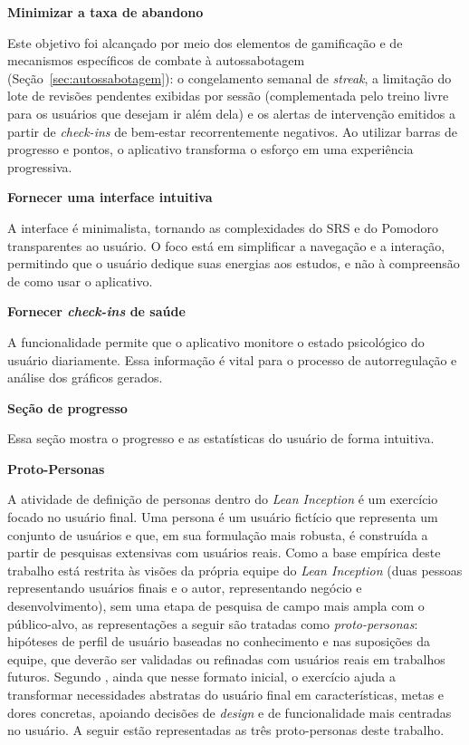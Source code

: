 \textbf{Minimizar a taxa de abandono}

Este objetivo foi alcançado por meio dos elementos de gamificação e de mecanismos específicos de combate à autossabotagem (Seção~\ref{sec:autossabotagem}): o congelamento semanal de \textit{streak}, a limitação do lote de revisões pendentes exibidas por sessão (complementada pelo treino livre para os usuários que desejam ir além dela) e os alertas de intervenção emitidos a partir de \textit{check-ins} de bem-estar recorrentemente negativos.
Ao utilizar barras de progresso e pontos, o aplicativo transforma o esforço em uma experiência progressiva.

\textbf{Fornecer uma interface intuitiva}

A interface é minimalista, tornando as complexidades do SRS e do Pomodoro transparentes ao usuário.
O foco está em simplificar a navegação e a interação, permitindo que o usuário dedique suas energias aos estudos, e não à compreensão de como usar o aplicativo.

\textbf{Fornecer \textit{check-ins} de saúde}

A funcionalidade permite que o aplicativo monitore o estado psicológico do usuário diariamente.
Essa informação é vital para o processo de autorregulação e análise dos gráficos gerados.

\textbf{Seção de progresso}

Essa seção mostra o progresso e as estatísticas do usuário de forma intuitiva.

\textbf{Proto-Personas}

A atividade de definição de personas dentro do \textit{Lean Inception} é um exercício focado no usuário final.
Uma persona é um usuário fictício que representa um conjunto de usuários e que, em sua formulação mais robusta, é construída a partir de pesquisas extensivas com usuários reais.
Como a base empírica deste trabalho está restrita às visões da própria equipe do \textit{Lean Inception} (duas pessoas representando usuários finais e o autor, representando negócio e desenvolvimento), sem uma etapa de pesquisa de campo mais ampla com o público-alvo, as representações a seguir são tratadas como \textit{proto-personas}: hipóteses de perfil de usuário baseadas no conhecimento e nas suposições da equipe, que deverão ser validadas ou refinadas com usuários reais em trabalhos futuros.
Segundo , ainda que nesse formato inicial, o exercício ajuda a transformar necessidades abstratas do usuário final em características, metas e dores concretas, apoiando decisões de \textit{design} e de funcionalidade mais centradas no usuário.
A seguir estão representadas as três proto-personas deste trabalho.

